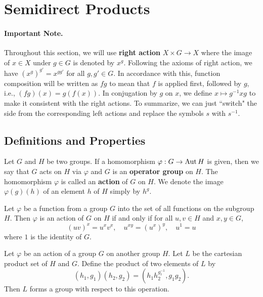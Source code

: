 \section{Semidirect Products}
\paragraph{Important Note.} Throughout this section, we will use \textbf{right action} $X\times G\rightarrow X$ where the image of $x\in X$ under $g\in G$ is denoted by $x^g$. Following the axioms of right action, we have $(x^g)^{g'} = x^{gg'}$ for all $g,g'\in G$. In accordance with this, function composition will be written as $fg$ to mean that $f$ is applied first, followed by $g$, i.e., $(fg)(x) = g(f(x))$. In conjugation by $g$ on $x$, we define $x\mapsto g^{-1}xg$ to make it consistent with the right actions.  To summarize, we can just ``switch" the side from the corresponding left actions and replace the symbols $s$ with $s^{-1}$.
\subsection{Definitions and Properties}
\begin{definition}
	Let $G$ and $H$ be two groups. If a homomorphism $\varphi:G \to \operatorname{Aut}  H$ is given, then we say that $G$ acts on $H$ via $\varphi$ and $G$ is an \textbf{operator group} on $H$. The homomorphism $\varphi$ is called an \textbf{action} of $G$ on $H$. We denote the image $\varphi(g)(h)$ of an element $h$ of $H$ simply by $h^g$.
\end{definition}

\begin{proposition} \label{prop-action-criterion-for-groups}
	Let $\varphi$ be a function from a group $G$ into the set of all functions on the subgroup $H$. Then $\varphi$ is an action of $G$ on $H$ if and only if for all $u, v \in H$ and $x, y \in G$,
	\begin{equation*}
		(uv)^x = u^x v^x, \quad
		u^{xy} = (u^x)^y,\quad
		u^1 = u
	\end{equation*}
	where $1$ is the identity of $G$.
\end{proposition} 
\begin{proposition} \label{prop-semidirect-prod}
	Let $\varphi$ be an action of a group $G$ on another group $H$. Let $L$ be the cartesian product set of $H$ and $G$. Define the product of two elements of $L$ by
	$$(h_1,g_1)(h_2,g_2) = (h_1h_2^{g_1^{-1}}, g_1g_2).$$
	Then $L$ forms a group with respect to this operation. 
\end{proposition}

